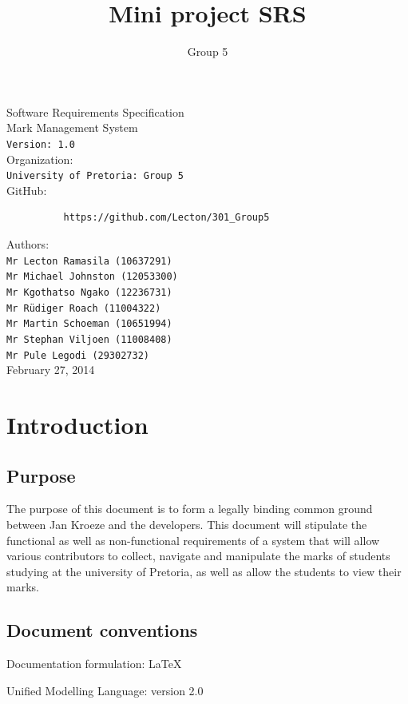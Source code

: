 \documentclass[10pt,a4paper]{article}
\author{Group 5}
\title{Mini project SRS}
\begin{document}
\begin{titlepage}
\begin{center}

\huge Software Requirements Specification\\[0.15cm]
\huge Mark Management System\\[0.15cm]
\large \texttt{Version: 1.0}\\[1cm]

Organization:\\
\texttt{University of Pretoria: Group 5}\\[0.5cm]
GitHub:\\[0.01cm]
\begin{verbatim}
          https://github.com/Lecton/301_Group5
\end{verbatim}

Authors:\\
\texttt{Mr Lecton Ramasila (10637291)\\
        Mr Michael Johnston (12053300)\\
        Mr Kgothatso Ngako (12236731)\\
        Mr Rüdiger Roach (11004322)\\
        Mr Martin Schoeman (10651994)\\
        Mr Stephan Viljoen (11008408)\\
        Mr Pule Legodi (29302732)}\\[1cm]
        
February 27, 2014
\end{center}
\end{titlepage}


\tableofcontents
\pagebreak
\section{Introduction}

\subsection{Purpose}
The purpose of this document is to form a legally binding common ground between Jan Kroeze and the developers. This document will stipulate the functional as well as non-functional requirements of a system that will allow various contributors to collect, navigate and manipulate the marks of students studying at the university of Pretoria, as well as allow the students to view their marks.

\subsection{Document conventions}
\begin{description}
\item Documentation formulation: LaTeX
\item Unified Modelling Language: version 2.0
\end{description}
\end{document}
